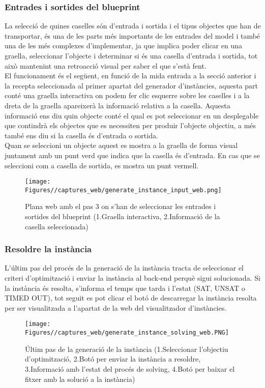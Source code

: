\subsubsection{Entrades i sortides del blueprint}
La selecció de quines caselles són d'entrada i sortida i el tipus objectes que han de transportar, és una de les parts més importants de les entrades del model i també una de les més complexes d'implementar, ja que implica poder clicar en una graella, seleccionar l'objecte i determinar si és una casella d'entrada i sortida, tot això mantenint una retroacció visual per saber el que s'està fent.\\

El funcionament és el següent, en funció de la mida entrada a la secció anterior i la recepta seleccionada al primer apartat del generador d'instàncies, aquesta part conté una graella interactiva on podem fer clic esquerre sobre les caselles i a la dreta de la graella apareixerà la informació relativa a la casella. Aquesta informació ens diu quin objecte conté el qual es pot seleccionar en un desplegable que contindrà els objectes que es necessiten per produir l'objecte objectiu, a més també ens diu si la casella és d'entrada o sortida.\\
Quan se seleccioni un objecte aquest es mostra a la graella de forma visual juntament amb un punt verd que indica que la casella és d'entrada. En cas que se seleccioni com a casella de sortida, es mostra un punt vermell.

\begin{figure}[H]
    \centering
    \texttt{[image: Figures//captures\_web/generate\_instance\_input\_web.png]}
    \caption{Plana web amb el pas 3 on s'han de seleccionar les entrades i sortides del blueprint (1.Graella interactiva, 2.Informació de la casella seleccionada)}
    \label{fig:generate_instance_input}
\end{figure}

\subsubsection{Resoldre la instància}
L'últim pas del procés de la generació de la instància tracta de seleccionar el criteri d'optimització i enviar la instància al back-end perquè sigui solucionada. Si la instància és resolta, s'informa el temps que tarda i l'estat (SAT, UNSAT o TIMED OUT), tot seguit es pot clicar el botó de descarregar la instància resolta per ser visualitzada a l'apartat de la web del visualitzador d'instàncies.
\begin{figure}[H]
    \centering
    \texttt{[image: Figures//captures\_web/generate\_instance\_solving\_web.PNG]}
    \caption{Últim pas de la generació de la instància (1.Seleccionar l'objectiu d'optimització, 2.Botó per enviar la instància a resoldre, 3.Informació amb l'estat del procés de solving, 4.Botó per baixar el fitxer amb la solució a la instància)}
    \label{fig:generate_instance_solving}
\end{figure}


